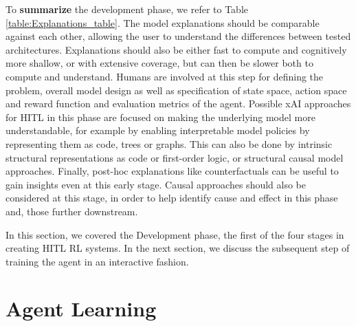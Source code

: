 \documentclass[twoside,11pt]{article}
\begin{document}
\begin{enumerate}
\noindent To \textbf{summarize} the development phase, we refer to Table \ref{table:Explanations_table}. The model explanations should be comparable against each other, allowing the user to understand the differences between tested architectures. Explanations should also be either fast to compute and cognitively more shallow, or with extensive coverage, but can then be slower both to compute and understand. Humans are involved at this step for defining the problem, overall model design as well as specification of state space, action space and reward function and evaluation metrics of the agent. Possible xAI approaches for HITL in this phase are focused on making the underlying model more understandable, for example by enabling interpretable model policies by representing them as code, trees or graphs. This can also be done by intrinsic structural representations as code or first-order logic, or structural causal model approaches. Finally, post-hoc explanations like counterfactuals can be useful to gain insights even at this early stage. Causal approaches should also be considered at this stage, in order to help identify cause and effect in this phase and, those further downstream.

In this section, we covered the Development phase, the first of the four stages in creating HITL RL systems. In the next section, we discuss the subsequent step of training the agent in an interactive fashion.

\section{Agent Learning}
\label{sec:AgentLearning}


\end{enumerate}
\end{document}

